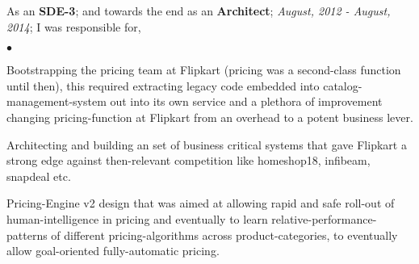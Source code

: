 \documentclass[margin,line]{res}
\newenvironment{list2}{
  \begin{list}{$\bullet$}{%
      \setlength{\itemsep}{0in}
      \setlength{\parsep}{0in} \setlength{\parskip}{0in}
      \setlength{\topsep}{0in} \setlength{\partopsep}{0in} 
      \setlength{\leftmargin}{0.2in}}}{\end{list}}
\begin{document}
\begin{resume}
As an {\bf SDE-3}; and towards the end as an {\bf Architect}; {\em August, 2012 - August, 2014}; I was responsible for,\\
\begin{list2}
\item Bootstrapping the pricing team at Flipkart (pricing was a second-class function until then), this required extracting legacy code embedded into catalog-management-system out into its own service and a plethora of improvement changing pricing-function at Flipkart from an overhead to a potent business lever.
\item Architecting and building an set of business critical systems that gave Flipkart a strong edge against then-relevant competition like homeshop18, infibeam, snapdeal etc.
\item Pricing-Engine v2 design that was aimed at allowing rapid and safe roll-out of human-intelligence in pricing and eventually to learn relative-performance-patterns of different pricing-algorithms across product-categories, to eventually allow goal-oriented fully-automatic pricing.
\end{list2}


\end{resume}
\end{document}
